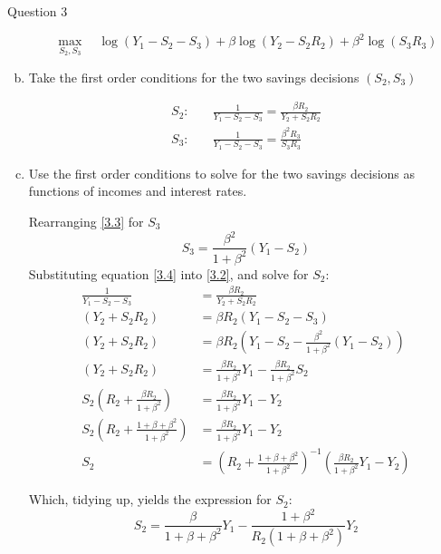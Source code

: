 \documentclass[a4paper]{article}
\newif\IfInSansMode
\begin{document}
\begin{questionbox}{Question 3}
\begin{enumerate}[(a)]
\begin{explanationbox}
				\[
					\max_{S_2,S_3} \quad \log(Y_1 - S_2 - S_3) + \beta\log(Y_2 - S_2R_2) + \beta^2\log(S_3R_3)
				\]
			\end{explanationbox}
			\item Take the first order conditions for the two savings decisions \( (S_2,S_3) \)
			\begin{explanationbox}
				\begin{align}
					S_2: \quad & \frac{1}{Y_1-S_2-S_3} = \frac{\beta R_2}{Y_2 + S_2R_2} \label{3.2}\\
					S_3: \quad & \frac{1}{Y_1-S_2-S_3} = \frac{\beta^2R_3}{S_3R_3} \label{3.3}
				\end{align}
			\end{explanationbox}
			\item Use the first order conditions to solve for the two savings decisions as functions of incomes and interest rates.
			\begin{explanationbox}
				Rearranging \cref{3.3} for \( S_3 \)
				\begin{equation}
					S_3 = \frac{\beta^2}{1+\beta^2}(Y_1 - S_2) \label{3.4}
				\end{equation}
				Substituting equation \cref{3.4} into \cref{3.2}, and solve for \( S_2 \):
				\begin{align*}
					\frac{1}{Y_1-S_2-S_3} &= \frac{\beta R_2}{Y_2 + S_2R_2}\\
					(Y_2 + S_2R_2) &= \beta R_2 (Y_1 - S_2 - S_3)\\
					(Y_2 + S_2R_2) &= \beta R_2 \left( Y_1 - S_2 - \frac{\beta^2}{1+\beta^2}(Y_1 - S_2) \right)\\
					(Y_2 + S_2R_2) &= \frac{\beta R_2}{1 + \beta^2} Y_1 - \frac{\beta R_2}{1 + \beta^2} S_2\\
					S_2 \left( R_2 + \frac{\beta R_2}{1 + \beta^2} \right) &= \frac{\beta R_2}{1 + \beta^2} Y_1-Y_2\\
					S_2 \left( R_2 + \frac{1 + \beta + \beta^2}{1 + \beta^2} \right) &= \frac{\beta R_2}{1 + \beta^2} Y_1-Y_2\\
					S_2 &= \left( R_2 + \frac{1 + \beta + \beta^2}{1 + \beta^2} \right)^{-1} \left( \frac{\beta R_2}{1 + \beta^2} Y_1-Y_2 \right)
				\end{align*}
			\end{explanationbox}
			\begin{explanationbox}
				Which, tidying up, yields the expression for \( S_2 \):
				\begin{equation}
					S_2 = \frac{\beta}{1 + \beta + \beta^2} Y_1 - \frac{1 + \beta^2}{R_2(1 + \beta + \beta^2)}Y_2 \label{3.5}

\end{equation}
\end{explanationbox}
\end{enumerate}
\end{questionbox}
\end{document}
